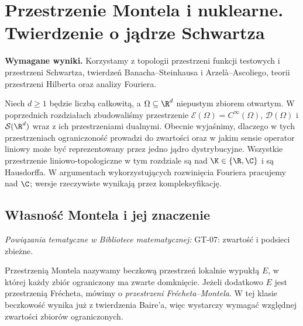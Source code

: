 \setcounter{section}{22}
\section{Przestrzenie Montela i nuklearne. Twierdzenie o jądrze Schwartza}
\label{sec:montel-nuklearne23}

\providecommand{\atlasref}[2]{#2}


\noindent\textbf{Wymagane wyniki.} Korzystamy z topologii
przestrzeni funkcji testowych i przestrzeni Schwartza,
twierdzeń Banacha--Steinhausa i Arzelà--Ascoliego,
teorii przestrzeni Hilberta oraz analizy Fouriera.
\medskip

Niech $d\ge1$ będzie liczbą całkowitą, a $\Omega\subseteq\R^d$
niepustym zbiorem otwartym. W poprzednich rozdziałach
zbudowaliśmy przestrzenie
$\mathcal E(\Omega)=C^\infty(\Omega)$,
$\mathcal D(\Omega)$ i $\mathcal S(\R^d)$ wraz z ich
przestrzeniami dualnymi. Obecnie wyjaśnimy, dlaczego w tych
przestrzeniach ograniczoność prowadzi do zwartości oraz w jakim
sensie operator liniowy może być reprezentowany przez jedno jądro
dystrybucyjne. Wszystkie przestrzenie liniowo-topologiczne w tym
rozdziale są nad $\K\in\{\R,\C\}$ i są Hausdorffa. W argumentach
wykorzystujących rozwinięcia Fouriera pracujemy nad $\C$;
wersje rzeczywiste wynikają przez kompleksyfikację.

\subsection{Własność Montela i jej znaczenie}

\noindent\emph{Powiązania tematyczne w Bibliotece matematycznej:} \atlasref{GT-07::thm:topog-zwartosc-sieci}{GT-07: zwartość i podsieci zbieżne}.


\begin{definicja}
\label{def:montel23}
Przestrzenią Montela nazywamy beczkową przestrzeń lokalnie wypukłą
$E$, w której każdy zbiór ograniczony ma zwarte domknięcie.
Jeżeli dodatkowo $E$ jest przestrzenią Frécheta, mówimy o
\emph{przestrzeni Frécheta--Montela}. W tej klasie beczkowość
wynika już z twierdzenia Baire'a, więc wystarczy wymagać
względnej zwartości zbiorów ograniczonych.
\end{definicja}

